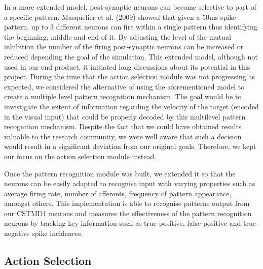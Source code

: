 \documentclass[a4paper,11pt]{article}
\begin{document}
	In a more extended model, post-synaptic neurons can become selective to part of a specific pattern. Masquelier et al. (2009) showed that given a 50ms spike pattern, up to 3 different neurons can fire within a single pattern thus identifying the beginning, middle and end of it. By adjusting the level of the mutual inhibition the number of the firing post-synaptic neurons can be increased or reduced depending the goal of the simulation. This extended model, although not used in our end product, it initiated long discussions about its potential in this project. During the time that the action selection module was not progressing as expected, we considered the alternative of using the aforementioned model to create a multiple level pattern recognition mechanism. The goal would be to investigate the extent of information regarding the velocity of the target (encoded in the visual input) that could be properly decoded by this multilevel pattern recognition mechanism. Despite the fact that we could have obtained results valuable to the research community, we were well aware that such a decision would result in a significant deviation from our original goals. Therefore, we kept our focus on the action selection module instead.\par

	Once the pattern recognition module was built, we extended it so that the neurons can be easily adapted to recognise input with varying properties such as average firing rate, number of afferents, frequency of pattern appearance, amongst others. This implementation is able to recognise patterns output from our CSTMD1 neurons and measures the effectiveness of the pattern recognition neurons by tracking key information such as true-positive, false-positive and true-negative spike incidences.

\subsection{Action Selection}
\end{document}
